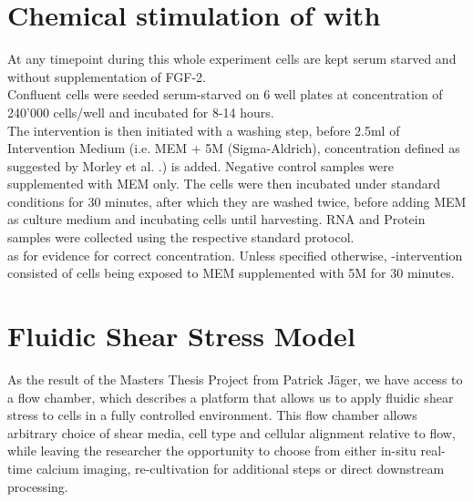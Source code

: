 \section{Chemical stimulation of \Piezo{} with \Yoda{}}
\label{sec:ChemicalStimulation}
At any timepoint during this whole experiment cells are kept serum starved and without supplementation of FGF-2.\\
Confluent cells were seeded serum-starved on 6 well plates at concentration of 240'000 cells/well and incubated for 8-14 hours.\\
The intervention is then initiated with a washing step, before 2.5ml of Intervention Medium (i.e. MEM\textalpha{} + 5\textmu{}M \Yoda (Sigma-Aldrich), concentration defined as suggested by Morley et al. \cite{Morley2018}.) is added. Negative control samples were supplemented with MEM\textalpha{} only. The cells were then incubated under standard conditions for 30 minutes, after which they are washed twice, before adding MEM\textalpha{} as culture medium and incubating cells until harvesting. RNA and Protein samples were collected using the respective standard protocol.\\ as for evidence for correct concentration. Unless specified otherwise, \Yoda{}-intervention consisted of cells being exposed to MEM\textalpha{} supplemented with 5\mul{}M \Yoda{} for 30 minutes. 

\section{Fluidic Shear Stress Model}
As the result of the Masters Thesis Project from Patrick Jäger, we have access to a flow chamber, which describes a platform that allows us to apply fluidic shear stress to cells in a fully controlled environment. This flow chamber allows arbitrary choice of shear media, cell type and cellular alignment relative to flow, while leaving the researcher the opportunity to choose from either in-situ real-time calcium imaging, re-cultivation for additional steps or direct downstream processing.

